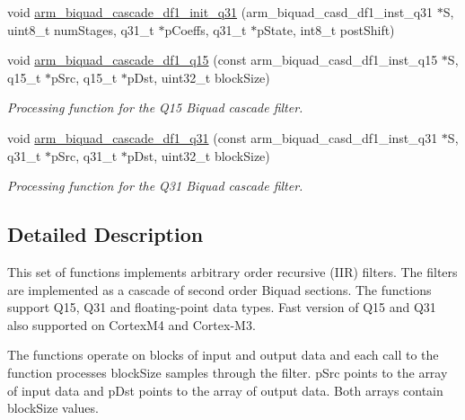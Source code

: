 \begin{DoxyCompactItemize}
\item 
void \hyperlink{group__BiquadCascadeDF1_gaf42a44f9b16d61e636418c83eefe577b}{arm\+\_\+biquad\+\_\+cascade\+\_\+df1\+\_\+init\+\_\+q31} (arm\+\_\+biquad\+\_\+casd\+\_\+df1\+\_\+inst\+\_\+q31 $\ast$S, uint8\+\_\+t num\+Stages, q31\+\_\+t $\ast$p\+Coeffs, q31\+\_\+t $\ast$p\+State, int8\+\_\+t post\+Shift)
\item 
void \hyperlink{group__BiquadCascadeDF1_gadd66a0aefdc645031d607b0a5b37a942}{arm\+\_\+biquad\+\_\+cascade\+\_\+df1\+\_\+q15} (const arm\+\_\+biquad\+\_\+casd\+\_\+df1\+\_\+inst\+\_\+q15 $\ast$S, q15\+\_\+t $\ast$p\+Src, q15\+\_\+t $\ast$p\+Dst, uint32\+\_\+t block\+Size)
\begin{DoxyCompactList}\small\item\em Processing function for the Q15 Biquad cascade filter. \end{DoxyCompactList}\item 
void \hyperlink{group__BiquadCascadeDF1_ga27b0c54da702713976e5202d20b4473f}{arm\+\_\+biquad\+\_\+cascade\+\_\+df1\+\_\+q31} (const arm\+\_\+biquad\+\_\+casd\+\_\+df1\+\_\+inst\+\_\+q31 $\ast$S, q31\+\_\+t $\ast$p\+Src, q31\+\_\+t $\ast$p\+Dst, uint32\+\_\+t block\+Size)
\begin{DoxyCompactList}\small\item\em Processing function for the Q31 Biquad cascade filter. \end{DoxyCompactList}\end{DoxyCompactItemize}


\subsection{Detailed Description}
This set of functions implements arbitrary order recursive (I\+IR) filters. The filters are implemented as a cascade of second order Biquad sections. The functions support Q15, Q31 and floating-\/point data types. Fast version of Q15 and Q31 also supported on Cortex\+M4 and Cortex-\/\+M3.

The functions operate on blocks of input and output data and each call to the function processes {\ttfamily block\+Size} samples through the filter. {\ttfamily p\+Src} points to the array of input data and {\ttfamily p\+Dst} points to the array of output data. Both arrays contain {\ttfamily block\+Size} values.

